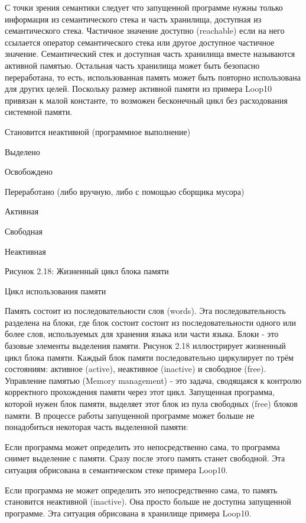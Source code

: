 С точки зрения семантики следует что запущенной программе нужны только информация из семантического стека и часть хранилища, доступная из семантического стека. Частичное значение доступно (reachable) если на него ссылается оператор семантического стека или другое доступное частичное значение. Семантический стек и доступная часть хранилища вместе называются активной памятью. Остальная часть хранилища может быть безопасно переработана, то есть, использованная память может быть повторно использована для других целей. Поскольку размер активной памяти из примера Loop10 привязан к малой константе, то возможен бесконечный цикл без расходования системной памяти.

Становится неактивной (программное выполнение)

Выделено

Освобождено

Переработано (либо вручную, либо с помощью сборщика мусора)

Активная

Свободная

Неактивная

Рисунок 2.18: Жизненный цикл блока памяти

Цикл использования памяти

Память состоит из последовательности слов (words). Эта последовательность разделена на блоки, где блок состоит состоит из последовательности одного или более слов, используемых для хранения языка или части языка. Блоки - это базовые элементы выделения памяти. Рисунок 2.18 иллюстрирует жизненный цикл блока памяти. Каждый блок памяти последовательно циркулирует по трём состояниям: активное (active), неактивное (inactive) и свободное (free). Управление памятью (Memory management) - это задача, сводящаяся к контролю корректного прохождения памяти через этот цикл. Запущенная программа, которой нужен блок памяти, выделяет этот блок из пула свободных (free) блоков памяти. В процессе работы запущенной программе может больше не понадобиться некоторая часть выделенной памяти:

Если программа может определить это непосредственно сама, то программа снимет выделение с памяти. Сразу после этого память станет свободной. Эта ситуация обрисована в семантическом стеке примера Loop10.

Если программа не может определить это непосредственно сама, то память становится неактивной (inactive). Она просто больше не доступна запущенной программе. Эта ситуация обрисована в хранилище примера Loop10.


